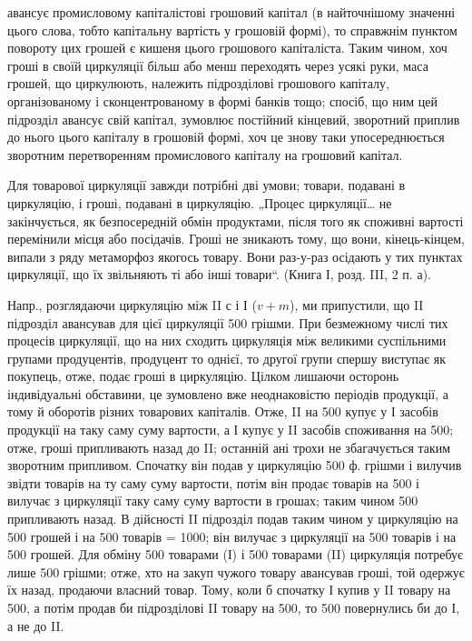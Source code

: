 \parcont{}  %
авансує промисловому капіталістові грошовий капітал (в найточнішому
значенні цього слова, тобто капітальну вартість у грошовій формі), то
справжнім пунктом повороту цих грошей є кишеня цього грошового
капіталіста. Таким чином, хоч гроші в своїй циркуляції більш або менш
переходять через усякі руки, маса грошей, що циркулюють, належить
підрозділові грошового капіталу, організованому і сконцентрованому в
формі банків тощо; спосіб, що ним цей підрозділ авансує свій капітал,
зумовлює постійний кінцевий, зворотний приплив до нього цього капіталу
в грошовій формі, хоч це знову таки упосереднюється зворотним перетворенням
промислового капіталу на грошовий капітал.

Для товарової циркуляції завжди потрібні дві умови; товари, подавані
в циркуляцію, і гроші, подавані в циркуляцію. „Процес циркуляції\dots{} не
закінчується, як безпосередній обмін продуктами, після того як споживні
вартості перемінили місця або посідачів. Гроші не зникають тому, що
вони, кінець-кінцем, випали з ряду метаморфоз якогось товару. Вони раз-у-раз
осідають у тих пунктах циркуляції, що їх звільняють ті або інші
товари“. (Книга І, розд. III, 2 п. а).

Напр., розглядаючи циркуляцію між II с і І ($v + m$), ми припустили,
що II підрозділ авансував для цієї циркуляції 500 грішми. При
безмежному числі тих процесів циркуляції, що на них сходить циркуляція
між великими суспільними групами продуцентів, продуцент то
однієї, то другої групи спершу виступає як покупець, отже, подає
гроші в циркуляцію. Цілком лишаючи осторонь індивідуальні обставини,
це зумовлено вже неоднаковістю періодів продукції, а тому й оборотів
різних товарових капіталів. Отже, II на 500 купує у І засобів
продукції на таку саму суму вартости, а І купує у II засобів споживання на
500; отже, гроші припливають назад до II; останній ані трохи
не збагачується таким зворотним припливом. Спочатку він подав у циркуляцію
500 ф. грішми і вилучив звідти товарів на ту саму суму вартости,
потім він продає товарів на 500 і вилучає з циркуляції
таку саму суму вартости в грошах; таким чином 500 припливають
назад. В дійсності II підрозділ подав таким чином у циркуляцію
на 500 грошей і на 500 товарів = 1000;
він вилучає з циркуляції на 500 товарів і на 500
грошей. Для обміну 500 товарами (І) і 500 товарами
(II) циркуляція потребує лише 500 грішми; отже,
хто на закуп чужого товару авансував гроші, той одержує їх
назад, продаючи власний товар. Тому, коли б спочатку І купив у II
товару на 500, а потім продав би підрозділові II товару на
500, то 500 повернулись би до І, а не до II.

